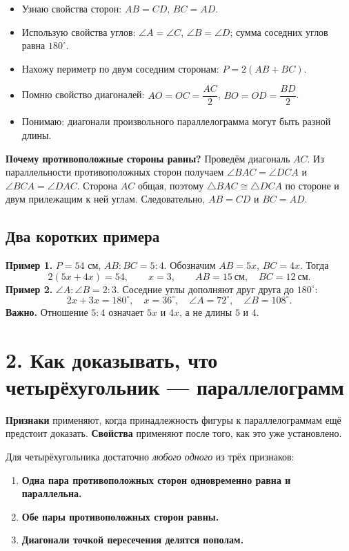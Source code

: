 \documentclass[a4paper,12pt]{article}
\newcommand{\key}[1]{\textbf{\color{darkaccent}#1}}
\newcommand{\checkitem}[1]{\item[\(\square\)] #1}
\newenvironment{skills}{\begin{itemize}[label=\(\square\),leftmargin=*,itemsep=2pt]}{\end{itemize}}
\begin{document}
\begin{skills}
\checkitem{Узнаю свойства сторон: \(AB=CD\), \(BC=AD\).}
\checkitem{Использую свойства углов: \(\angle A=\angle C\), \(\angle B=\angle D\); сумма соседних углов равна \(180^\circ\).}
\checkitem{Нахожу периметр по двум соседним сторонам: \(P=2(AB+BC)\).}
\checkitem{Помню свойство диагоналей: \(AO=OC=\dfrac{AC}{2}\), \(BO=OD=\dfrac{BD}{2}\).}
\checkitem{Понимаю: диагонали произвольного параллелограмма могут быть разной длины.}
\end{skills}

\key{Почему противоположные стороны равны?} Проведём диагональ \(AC\). Из параллельности противоположных сторон получаем \(\angle BAC=\angle DCA\) и \(\angle BCA=\angle DAC\). Сторона \(AC\) общая, поэтому \(\triangle BAC\cong\triangle DCA\) по стороне и двум прилежащим к ней углам. Следовательно, \(AB=CD\) и \(BC=AD\).

\subsection*{Два коротких примера}
\textbf{Пример 1.} \(P=54\) см, \(AB:BC=5:4\). Обозначим \(AB=5x\), \(BC=4x\). Тогда
\[
  2(5x+4x)=54,\qquad x=3,\qquad AB=15\ \text{см},\quad BC=12\ \text{см}.
\]
\textbf{Пример 2.} \(\angle A:\angle B=2:3\). Соседние углы дополняют друг друга до \(180^\circ\):
\[
2x+3x=180^\circ,\quad x=36^\circ,\quad \angle A=72^\circ,\quad\angle B=108^\circ.
\]
\key{Важно.} Отношение \(5:4\) означает \(5x\) и \(4x\), а не длины \(5\) и \(4\).

\clearpage
\section*{2. Как доказывать, что четырёхугольник --- параллелограмм}
\key{Признаки} применяют, когда принадлежность фигуры к параллелограммам ещё предстоит доказать. \key{Свойства} применяют после того, как это уже установлено.

Для четырёхугольника достаточно \emph{любого одного} из трёх признаков:
\begin{enumerate}[label=\textbf{\arabic*.},itemsep=3pt]
\item \key{Одна пара противоположных сторон одновременно равна и параллельна.}
\item \key{Обе пары противоположных сторон равны.}
\item \key{Диагонали точкой пересечения делятся пополам.}
\end{enumerate}
\end{document}
